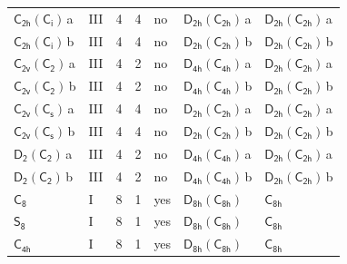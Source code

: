 \documentclass[10pt,a4paper]{article}
\numberwithin{equation}{section}
\newcommand{\grp}[1]{\mathsf{#1}}
\newcommand{\clsletter}[1]{\,{\scriptsize\color{black!55}#1}}
\begin{document}
{\begin{longtable}{@{}llrrlll@{}}
\href{C2h-S2.pdf}{$\grp{C_{2h}}(\grp{C_{i}})$}\clsletter{a} & III & 4 & 4 & no & \href{D2h-C2h.pdf}{$\grp{D_{2h}}(\grp{C_{2h}})$}\clsletter{a} & \href{D2h-C2h.pdf}{$\grp{D_{2h}}(\grp{C_{2h}})$}\clsletter{a}\\
\href{C2h-S2.pdf}{$\grp{C_{2h}}(\grp{C_{i}})$}\clsletter{b} & III & 4 & 4 & no & \href{D2h-C2h.pdf}{$\grp{D_{2h}}(\grp{C_{2h}})$}\clsletter{b} & \href{D2h-C2h.pdf}{$\grp{D_{2h}}(\grp{C_{2h}})$}\clsletter{b}\\
\href{C2v-C2.pdf}{$\grp{C_{2v}}(\grp{C_{2}})$}\clsletter{a} & III & 4 & 2 & no & \href{D4h-C4h.pdf}{$\grp{D_{4h}}(\grp{C_{4h}})$}\clsletter{a} & \href{D2h-C2h.pdf}{$\grp{D_{2h}}(\grp{C_{2h}})$}\clsletter{a}\\
\href{C2v-C2.pdf}{$\grp{C_{2v}}(\grp{C_{2}})$}\clsletter{b} & III & 4 & 2 & no & \href{D4h-C4h.pdf}{$\grp{D_{4h}}(\grp{C_{4h}})$}\clsletter{b} & \href{D2h-C2h.pdf}{$\grp{D_{2h}}(\grp{C_{2h}})$}\clsletter{b}\\
\href{C2v-C1v.pdf}{$\grp{C_{2v}}(\grp{C_{s}})$}\clsletter{a} & III & 4 & 4 & no & \href{D2h-C2h.pdf}{$\grp{D_{2h}}(\grp{C_{2h}})$}\clsletter{a} & \href{D2h-C2h.pdf}{$\grp{D_{2h}}(\grp{C_{2h}})$}\clsletter{a}\\
\href{C2v-C1v.pdf}{$\grp{C_{2v}}(\grp{C_{s}})$}\clsletter{b} & III & 4 & 4 & no & \href{D2h-C2h.pdf}{$\grp{D_{2h}}(\grp{C_{2h}})$}\clsletter{b} & \href{D2h-C2h.pdf}{$\grp{D_{2h}}(\grp{C_{2h}})$}\clsletter{b}\\
\href{D2-C2.pdf}{$\grp{D_{2}}(\grp{C_{2}})$}\clsletter{a} & III & 4 & 2 & no & \href{D4h-C4h.pdf}{$\grp{D_{4h}}(\grp{C_{4h}})$}\clsletter{a} & \href{D2h-C2h.pdf}{$\grp{D_{2h}}(\grp{C_{2h}})$}\clsletter{a}\\
\href{D2-C2.pdf}{$\grp{D_{2}}(\grp{C_{2}})$}\clsletter{b} & III & 4 & 2 & no & \href{D4h-C4h.pdf}{$\grp{D_{4h}}(\grp{C_{4h}})$}\clsletter{b} & \href{D2h-C2h.pdf}{$\grp{D_{2h}}(\grp{C_{2h}})$}\clsletter{b}\\
\href{../../../rotation/data/pdf/C8.pdf}{$\grp{C_{8}}$} & I & 8 & 1 & yes & \href{D8h-C8h.pdf}{$\grp{D_{8h}}(\grp{C_{8h}})$} & \href{../../../rotation/data/pdf/C8h.pdf}{$\grp{C_{8h}}$}\\
\href{../../../rotation/data/pdf/S8.pdf}{$\grp{S_{8}}$} & I & 8 & 1 & yes & \href{D8h-C8h.pdf}{$\grp{D_{8h}}(\grp{C_{8h}})$} & \href{../../../rotation/data/pdf/C8h.pdf}{$\grp{C_{8h}}$}\\
\href{../../../rotation/data/pdf/C4h.pdf}{$\grp{C_{4h}}$} & I & 8 & 1 & yes & \href{D8h-C8h.pdf}{$\grp{D_{8h}}(\grp{C_{8h}})$} & \href{../../../rotation/data/pdf/C8h.pdf}{$\grp{C_{8h}}$}\\

\end{longtable}}
\end{document}
